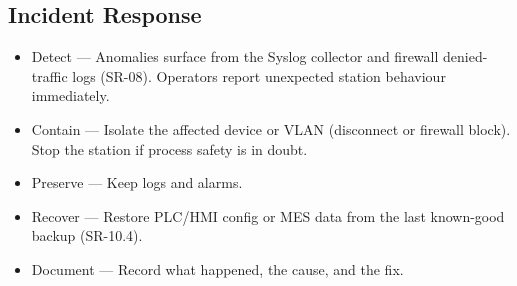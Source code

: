 \documentclass{article}
\begin{document}
\subsection{Incident Response}
\begin{itemize}
    \item Detect — Anomalies surface from the Syslog collector and firewall denied-traffic logs (SR-08). Operators report unexpected station behaviour immediately.
    \item Contain — Isolate the affected device or VLAN (disconnect or firewall block). Stop the station if process safety is in doubt.
    \item Preserve — Keep logs and alarms.
    \item Recover — Restore PLC/HMI config or MES data from the last known-good backup (SR-10.4).
    \item Document — Record what happened, the cause, and the fix. 
\end{itemize}
\end{document}
